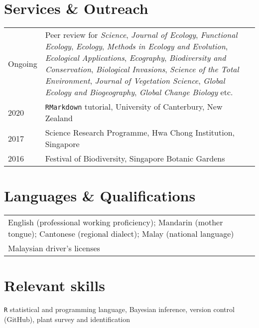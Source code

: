 \documentclass[a4paper]{article}
\begin{document}
\section*{Services \& Outreach}
\begin{tabular}{p{0.13\linewidth} p{0.87\linewidth}}
Ongoing & Peer review for \textit{Science}, \textit{Journal of Ecology}, \textit{Functional Ecology}, \textit{Ecology}, \textit{Methods in Ecology and Evolution}, \textit{Ecological Applications}, \textit{Ecography}, \textit{Biodiversity and Conservation}, \textit{Biological Invasions}, \textit{Science of the Total Environment}, \textit{Journal of Vegetation Science}, \textit{Global Ecology and Biogeography}, \textit{Global Change Biology} etc.\\
2020 & \texttt{RMarkdown} tutorial, University of Canterbury, New Zealand \\
2017 & Science Research Programme, Hwa Chong Institution, Singapore \\
2016 & Festival of Biodiversity, Singapore Botanic Gardens \\
\end{tabular}


\section*{Languages \& Qualifications}
\begin{tabular}{p{\linewidth}}
English (professional working proficiency); Mandarin (mother tongue); Cantonese (regional dialect); Malay (national language) \\
Malaysian driver's licenses \\
\end{tabular}


\section*{Relevant skills}
\texttt{R} statistical and programming language, Bayesian inference, version control (GitHub), plant survey and identification
\end{document}
